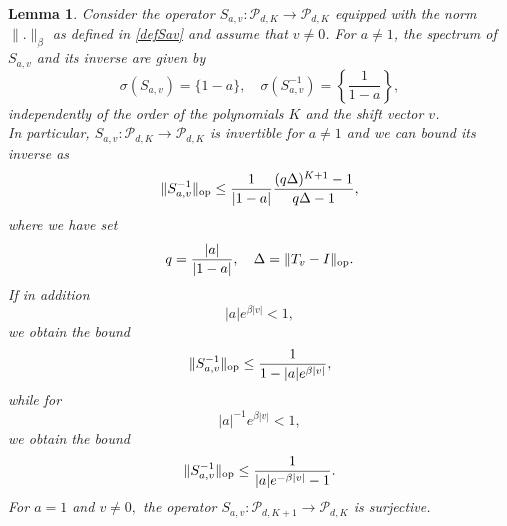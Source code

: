 \documentclass{amsart}
\theoremstyle{plain}
\newtheorem{lemma}[theorem]{Lemma}
\theoremstyle{definition}
\begin{document}
\begin{lemma}\label{shifted}
 Consider the operator $S_{a,v}:\mathcal{P}_{d,K}\to\mathcal{P}_{d,K}$ equipped with the norm $\|.\|_{\beta}$ as defined in \eqref{defSav} and assume that $v\neq 0$. For $a\neq 1$, the spectrum of $S_{a,v}$ and its inverse are given by 
 \begin{equation}\label{sigmaSav}
 \sigma(S_{a,v}) = \{1-a\},\quad  \sigma(S_{a,v}^{-1}) = \left\{\frac{1}{1-a}\right\},
 \end{equation}
 independently of the order of the polynomials $K$ and the shift vector $v$.\\
 In particular, $S_{a,v}:\mathcal{P}_{d,K}\to\mathcal{P}_{d,K}$ is invertible for $a\neq 1$ and we can bound its inverse as 
     \begin{equation}\label{boundSavinvfull}
    \|S_{a,v}^{-1}\|_{\rm op} \leq \frac{1}{|1-a|}\frac{(q\Delta)^{K+1}-1}{q\Delta-1},
\end{equation}
where we have set
\begin{equation}
    q = \frac{|a|}{|1-a|},\quad \Delta =\|T_v-I\|_{\rm op}.
\end{equation}
If in addition
\begin{equation}\label{boundaevb}
   |a| e^{\beta|v|}<1, 
\end{equation}
we obtain the bound
\begin{equation}\label{boundSavinv}
    \|S_{a,v}^{-1}\|_{\rm op} \leq \frac{1}{1- |a| e^{\beta|v|}},
\end{equation}
while for
\begin{equation}
|a|^{-1} e^{\beta |v|}<1,
\end{equation}
we obtain the bound
\begin{equation}\label{boundSavbinv2}
\|S_{a,v}^{-1}\|_{\rm op}\leq \frac{1}{|a|e^{-\beta|v|}-1}.
\end{equation}
For $a=1$ and $v\neq 0,$ the operator $S_{a,v}:\mathcal{P}_{d,K+1}\to\mathcal{P}_{d,K}$ is surjective. 
\end{lemma}
\end{document}
